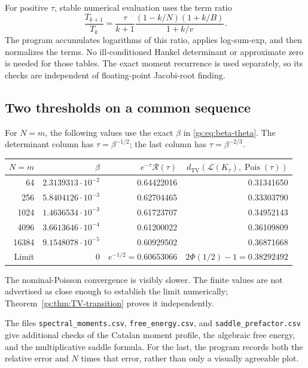 \documentclass[11pt,a4paper]{article}
\numberwithin{equation}{section}
\theoremstyle{definition}
\theoremstyle{remark}
\newcommand{\Rgs}{\mathcal R}
\newcommand{\Pois}{\operatorname{Pois}}
\newcommand{\TV}{d_{\mathrm{TV}}}
\newcommand{\Law}{\mathcal L}
\begin{document}
For positive $\tau$, stable numerical evaluation uses the term ratio
\begin{equation}\label{gs:eq:numeric-ratio}
 \frac{T_{k+1}}{T_k}
 =\frac{\tau}{k+1}
   \frac{(1-k/N)(1+k/B)}{1+k/v}.
\end{equation}
The program accumulates logarithms of this ratio, applies log-sum-exp, and
then normalizes the terms. No ill-conditioned Hankel determinant or
approximate zero is needed for those tables. The exact moment recurrence
is used separately, so its checks are independent of floating-point
Jacobi-root finding.

\subsection{Two thresholds on a common sequence}\label{gs:sec:twothresholds}
For $N=m$, the following values use the exact $\beta$ in
\eqref{gs:eq:beta-theta}. The determinant column has $\tau=\beta^{-1/2}$;
the last column has $\tau=\beta^{-2/3}$.
\begin{center}
\renewcommand{\arraystretch}{1.2}
\begin{tabular}{@{}rrrr@{}}
\toprule
$N=m$ & $\beta$ & $e^{-\tau}\Rgs(\tau)$ &
$\TV(\Law(K_\tau),\Pois(\tau))$\\
\midrule
64    & $2.3139313\cdot10^{-2}$ & 0.64422016 & 0.31341650\\
256   & $5.8404126\cdot10^{-3}$ & 0.62704465 & 0.33303790\\
1024  & $1.4636534\cdot10^{-3}$ & 0.61723707 & 0.34952143\\
4096  & $3.6613646\cdot10^{-4}$ & 0.61200022 & 0.36109809\\
16384 & $9.1548078\cdot10^{-5}$ & 0.60929502 & 0.36871668\\
\midrule
Limit & 0 & $e^{-1/2}=0.60653066$ & $2\Phi(1/2)-1=0.38292492$\\
\bottomrule
\end{tabular}
\end{center}
The nominal-Poisson convergence is visibly slower. The finite values are
not advertised as close enough to establish the limit numerically;
Theorem~\ref{gs:thm:TV-transition} proves it independently.

The files \texttt{spectral\_moments.csv}, \texttt{free\_energy.csv}, and
\texttt{saddle\_prefactor.csv} give additional checks of the Catalan moment
profile, the algebraic free energy, and the multiplicative saddle formula.
For the last, the program records both the relative error and $N$ times
that error, rather than only a visually agreeable plot.
\end{document}
